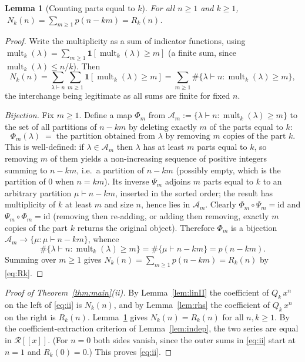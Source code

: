 \documentclass[12pt]{article}
\newtheorem{lemma}{Lemma}
\theoremstyle{definition}
\DeclareMathOperator{\mult}{mult}
\begin{document}
\begin{lemma}[Counting parts equal to $k$]\label{lem:partcount}
For all $n\ge1$ and $k\ge1$, $\;N_k(n)=\sum_{m\ge1}p(n-km)=R_k(n)$.
\end{lemma}

\begin{proof}
Write the multiplicity as a sum of indicator functions, using
$\mult_k(\lambda)=\sum_{m\ge1}\mathbf 1[\mult_k(\lambda)\ge m]$ (a finite sum, since
$\mult_k(\lambda)\le n/k$). Then
\[
N_k(n)=\sum_{\lambda\vdash n}\sum_{m\ge1}\mathbf 1[\mult_k(\lambda)\ge m]
=\sum_{m\ge1}\#\{\lambda\vdash n:\mult_k(\lambda)\ge m\},
\]
the interchange being legitimate as all sums are finite for fixed $n$.

\emph{Bijection.} Fix $m\ge1$. Define a map $\Phi_m$ from
$\mathcal A_m:=\{\lambda\vdash n:\mult_k(\lambda)\ge m\}$ to the set of all
partitions of $n-km$ by deleting exactly $m$ of the parts equal to $k$:
\[
\Phi_m(\lambda)\;=\;\text{the partition obtained from }\lambda\text{ by removing }m
\text{ copies of the part }k.
\]
This is well-defined: if $\lambda\in\mathcal A_m$ then $\lambda$ has at least $m$
parts equal to $k$, so removing $m$ of them yields a non-increasing sequence of
positive integers summing to $n-km$, i.e.\ a partition of $n-km$ (possibly empty,
which is the partition of $0$ when $n=km$). Its inverse $\Psi_m$ adjoins $m$ parts
equal to $k$ to an arbitrary partition $\mu\vdash n-km$, inserted in the sorted order;
the result has multiplicity of $k$ at least $m$ and size $n$, hence lies in
$\mathcal A_m$. Clearly $\Phi_m\circ\Psi_m=\mathrm{id}$ and $\Psi_m\circ\Phi_m=\mathrm{id}$
(removing then re-adding, or adding then removing, exactly $m$ copies of the part
$k$ returns the original object). Therefore $\Phi_m$ is a bijection
$\mathcal A_m\to\{\mu:\mu\vdash n-km\}$, whence
\[
\#\{\lambda\vdash n:\mult_k(\lambda)\ge m\}=\#\{\mu\vdash n-km\}=p(n-km).
\]
Summing over $m\ge1$ gives $N_k(n)=\sum_{m\ge1}p(n-km)=R_k(n)$ by \eqref{eq:Rk}.
\end{proof}

\begin{proof}[Proof of Theorem~\ref{thm:main}(ii)]
By Lemma~\ref{lem:linII} the coefficient of $Q_k\,x^n$ on the left of \eqref{eq:ii}
is $N_k(n)$, and by Lemma~\ref{lem:rhs} the coefficient of $Q_k\,x^n$ on the right is
$R_k(n)$. Lemma~\ref{lem:partcount} gives $N_k(n)=R_k(n)$ for all $n,k\ge1$. By the
coefficient-extraction criterion of Lemma~\ref{lem:indep}, the two series are equal
in $\mathcal R[[x]]$. (For $n=0$ both sides vanish, since the outer sums in
\eqref{eq:ii} start at $n=1$ and $R_k(0)=0$.) This proves \eqref{eq:ii}.
\end{proof}
\end{document}
